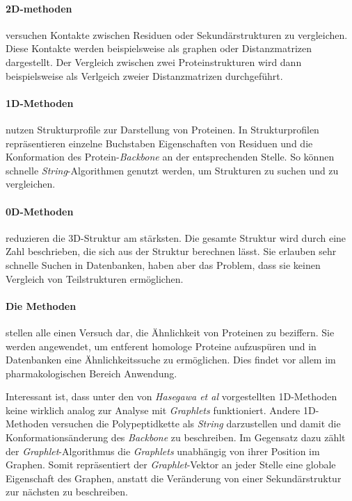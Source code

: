 \documentclass{report}
\begin{document}
\paragraph{2D-methoden} versuchen Kontakte zwischen Residuen oder Sekund\"arstrukturen zu vergleichen. Diese Kontakte werden beispielsweise als graphen oder Distanzmatrizen dargestellt. Der Vergleich zwischen zwei Proteinstrukturen wird dann beispielsweise als Verlgeich zweier Distanzmatrizen durchgef\"uhrt.

\paragraph{1D-Methoden} nutzen Strukturprofile zur Darstellung von Proteinen. In Strukturprofilen repr\"asentieren einzelne Buchstaben Eigenschaften von Residuen und die Konformation des Protein-\textit{Backbone} an der entsprechenden Stelle. So k\"onnen schnelle \textit{String}-Algorithmen genutzt werden, um Strukturen zu suchen und zu vergleichen.

\paragraph{0D-Methoden} reduzieren die 3D-Struktur am st\"arksten. Die gesamte Struktur wird durch eine Zahl beschrieben, die sich aus der Struktur berechnen l\"asst. Sie erlauben sehr schnelle Suchen in Datenbanken, haben aber das Problem, dass sie keinen Vergleich von Teilstrukturen erm\"oglichen.

\paragraph{Die Methoden} stellen alle einen Versuch dar, die \"Ahnlichkeit von Proteinen zu beziffern. Sie werden angewendet, um entferent homologe Proteine aufzusp\"uren und in Datenbanken eine \"Ahnlichkeitssuche zu erm\"oglichen. Dies findet vor allem im pharmakologischen Bereich Anwendung.

Interessant ist, dass unter den von \textit{Hasegawa et al} vorgestellten 1D-Methoden keine wirklich analog zur Analyse mit \textit{Graphlets} funktioniert. Andere 1D-Methoden versuchen die Polypeptidkette als \textit{String} darzustellen und damit die Konformations\"anderung des \textit{Backbone} zu beschreiben. Im Gegensatz dazu z\"ahlt der \textit{Graphlet}-Algorithmus die \textit{Graphlets} unabh\"angig von ihrer Position im Graphen. Somit repr\"asentiert der \textit{Graphlet}-Vektor an jeder Stelle eine globale Eigenschaft des Graphen, anstatt die Ver\"anderung von einer Sekund\"arstruktur zur n\"achsten zu beschreiben.
\end{document}
